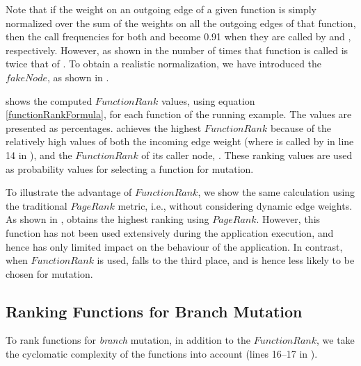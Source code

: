 Note that if the weight on an outgoing edge of a given function is simply normalized over the sum of the weights on all the outgoing edges of that function, then the call frequencies  
for both  and  become 0.91 when they are called by  and , respectively. However, as shown in  the number of times that function  is called is twice that of . To obtain a realistic normalization, we have introduced the $fakeNode$, as shown in .
 
 shows the computed 
$FunctionRank$ values, using equation \ref{functionRankFormula}, for each function of the running example. The values are presented as percentages.  achieves the highest $FunctionRank$ because of the relatively high values of both the incoming edge weight (where  is called by  in line 14 in ), and the $FunctionRank$ of its caller node, .
These ranking values are used as probability values for selecting a function for mutation. 

To illustrate the advantage of $FunctionRank$, we show the same calculation using the traditional $PageRank$ metric, i.e., without considering dynamic edge weights. As shown in ,  obtains the highest ranking using $PageRank$. However, this function has not been used extensively during the application execution, and hence has only limited impact on the behaviour of the application. 
In contrast, when $FunctionRank$ is used,  falls to the third place, and is hence less likely to be chosen for mutation. 




\subsection{Ranking Functions for Branch Mutation}
\label{Sec:funcrank-branch}
To rank functions for \emph{branch} mutation, in addition to the $FunctionRank$, we take the cyclomatic complexity of the functions into account (lines 16--17 in ).

